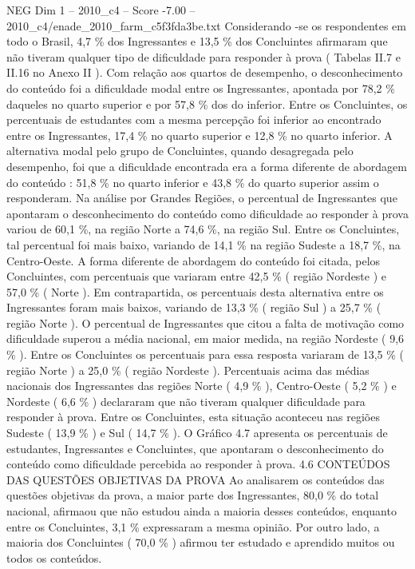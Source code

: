 \begin{textsample}{NEG Dim 1 – 2010\_c4 – Score -7.00 – 2010\_c4/enade\_2010\_farm\_c5f3fda3be.txt}
Considerando -se os respondentes em todo o Brasil, 4,7 \% dos Ingressantes e 13,5 \% dos Concluintes afirmaram que não tiveram qualquer tipo de dificuldade para responder à prova ( Tabelas II.7 e II.16 no Anexo II ).
Com relação aos quartos de desempenho, o desconhecimento do conteúdo foi a dificuldade modal entre os Ingressantes, apontada por 78,2 \% daqueles no quarto superior e por 57,8 \% dos do inferior.
Entre os Concluintes, os percentuais de estudantes com a mesma percepção foi inferior ao encontrado entre os Ingressantes, 17,4 \% no quarto superior e 12,8 \% no quarto inferior.
A alternativa modal pelo grupo de Concluintes, quando desagregada pelo desempenho, foi que a dificuldade encontrada era a forma diferente de abordagem do conteúdo : 51,8 \% no quarto inferior e 43,8 \% do quarto superior assim o responderam.
Na análise por Grandes Regiões, o percentual de Ingressantes que apontaram o desconhecimento do conteúdo como dificuldade ao responder à prova variou de 60,1 \%, na região Norte a 74,6 \%, na região Sul.
Entre os Concluintes, tal percentual foi mais baixo, variando de 14,1 \% na região Sudeste a 18,7 \%, na Centro-Oeste.
A forma diferente de abordagem do conteúdo foi citada, pelos Concluintes, com percentuais que variaram entre 42,5 \% ( região Nordeste ) e 57,0 \% ( Norte ).
Em contrapartida, os percentuais desta alternativa entre os Ingressantes foram mais baixos, variando de 13,3 \% ( região Sul ) a 25,7 \% ( região Norte ).
O percentual de Ingressantes que citou a falta de motivação como dificuldade superou a média nacional, em maior medida, na região Nordeste ( 9,6 \% ).
Entre os Concluintes os percentuais para essa resposta variaram de 13,5 \% ( região Norte ) a 25,0 \% ( região Nordeste ).
Percentuais acima das médias nacionais dos Ingressantes das regiões Norte ( 4,9 \% ), Centro-Oeste ( 5,2 \% ) e Nordeste ( 6,6 \% ) declararam que não tiveram qualquer dificuldade para responder à prova.
Entre os Concluintes, esta situação aconteceu nas regiões Sudeste ( 13,9 \% ) e Sul ( 14,7 \% ).
O Gráfico 4.7 apresenta os percentuais de estudantes, Ingressantes e Concluintes, que apontaram o desconhecimento do conteúdo como dificuldade percebida ao responder à prova. 4.6 CONTEÚDOS DAS QUESTÕES OBJETIVAS DA PROVA Ao analisarem os conteúdos das questões objetivas da prova, a maior parte dos Ingressantes, 80,0 \% do total nacional, afirmaou que não estudou ainda a maioria desses conteúdos, enquanto entre os Concluintes, 3,1 \% expressaram a mesma opinião.
Por outro lado, a maioria dos Concluintes ( 70,0 \% ) afirmou ter estudado e aprendido muitos ou todos os conteúdos.

\end{textsample}
